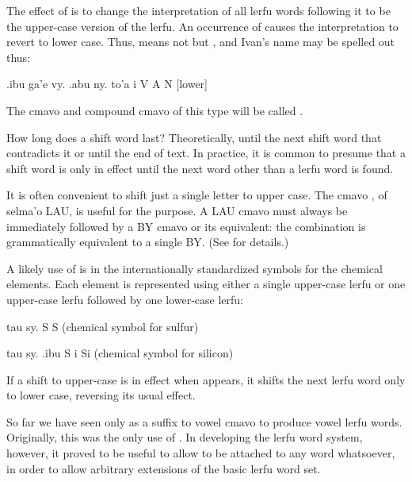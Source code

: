 The effect of  is to change the interpretation of
    all lerfu words following it to be the upper-case version of
    the lerfu. An occurrence of  causes the interpretation
    to revert to lower case. Thus,  means not 
    but , and Ivan's name may be spelled out thus:
\begin{example}
.ibu ga'e vy. .abu ny. to'a\n
i  V A N [lower]
\end{example}

The cmavo and compound cmavo of this type will be called
    . 

How long does a shift word last? Theoretically, until the
    next shift word that contradicts it or until the end of text.
    In practice, it is common to presume that a shift word is only
    in effect until the next word other than a lerfu word is
    found.

It is often convenient to shift just a single letter to
    upper case. The cmavo , of selma'o LAU, is useful for
    the purpose. A LAU cmavo must always be immediately followed by
    a BY cmavo or its equivalent: the combination is grammatically
    equivalent to a single BY. (See 
    for details.)

A likely use of  is in the internationally
    standardized symbols for the chemical elements. Each element is
    represented using either a single upper-case lerfu or one
    upper-case lerfu followed by one lower-case lerfu:
\begin{example}
tau sy.\n
{} S\n
S (chemical symbol for sulfur)
\end{example}

\begin{example}
tau sy. .ibu\n
{} S i\n
Si (chemical symbol for silicon)
\end{example}

If a shift to upper-case is in effect when  appears, it
    shifts the next lerfu word only to lower case, reversing its
    usual effect.




So far we have seen  only as a suffix to vowel cmavo
    to produce vowel lerfu words. Originally, this was the only use
    of . In developing the lerfu word system, however, it
    proved to be useful to allow  to be attached to any word
    whatsoever, in order to allow arbitrary extensions of the basic
    lerfu word set.

